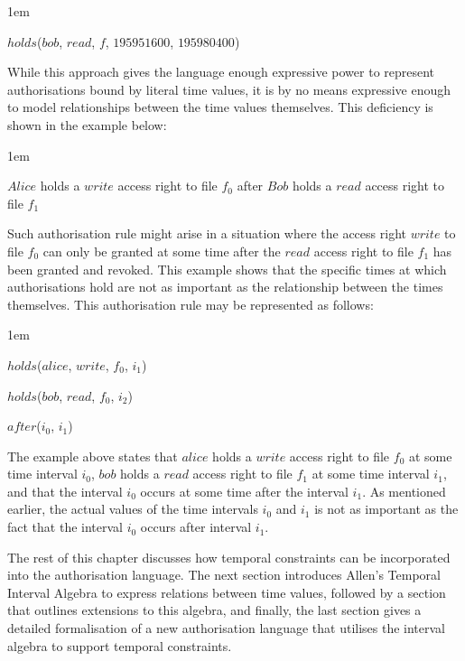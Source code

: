 \documentclass[11pt]{report}
\newenvironment{vquote}
{
  \begin{list}{}{\leftmargin 1em}\item[]
}
{
  \end{list}
}
\begin{document}
      \begin{vquote}
        $holds$($bob$, $read$, $f$, $195951600$, $195980400$)
      \end{vquote}

      While this approach gives the language enough expressive power to
      represent authorisations bound by literal time values, it is by no means
      expressive enough to model relationships between the time values
      themselves. This deficiency is shown in the example below:
 
      \begin{vquote}
        $Alice$ holds a $write$ access right to file $f_0$ after $Bob$ holds a
        $read$ access right to file $f_1$
      \end{vquote}
 
      Such authorisation rule might arise in a situation where the access right
      $write$ to file $f_0$ can only be granted at some time after the $read$
      access right to file $f_1$ has been granted and revoked. This example
      shows that the specific times at which authorisations hold are not as
      important as the relationship between the times themselves. This
      authorisation rule may be represented as follows:

      \begin{vquote}
        $holds$($alice$, $write$, $f_0$, $i_{1}$)
 
        $holds$($bob$, $read$, $f_0$, $i_{2}$)
 
        $after$($i_0$, $i_1$)
      \end{vquote}
 
      The example above states that $alice$ holds a $write$ access right to
      file $f_0$ at some time interval $i_0$, $bob$ holds a $read$ access right
      to file $f_1$ at some time interval $i_1$, and that the interval $i_0$
      occurs at some time after the interval $i_1$. As mentioned earlier, the
      actual values of the time intervals $i_0$ and $i_1$ is not as important
      as the fact that the interval $i_0$ occurs after interval $i_1$.

      The rest of this chapter discusses how temporal constraints can be
      incorporated into the authorisation language. The next section introduces
      Allen's Temporal Interval Algebra to express relations between time
      values, followed by a section that outlines extensions to this algebra,
      and finally, the last section gives a detailed formalisation of a new
      authorisation language that utilises the interval algebra to support
      temporal constraints.
\end{document}

